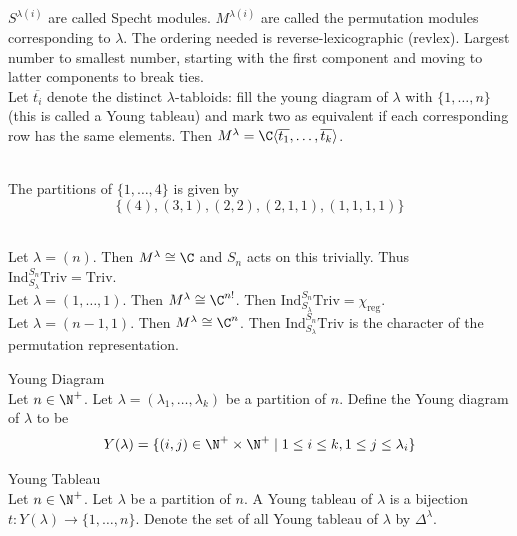 \documentclass[a4paper]{article}
\begin{document}
$S^{\lambda(i)}$ are called Specht modules. $M^{\lambda(i)}$ are called the permutation modules corresponding to $\lambda$. The ordering needed is reverse-lexicographic (revlex). Largest number to smallest number, starting with the first component and moving to latter components to break ties. \\

Let $\overline{t_i}$ denote the distinct $\lambda$-tabloids: fill the young diagram of $\lambda$ with $\{1,\dots,n\}$ (this is called a Young tableau) and mark two as equivalent if each corresponding row has the same elements. Then $M^\lambda=\C\langle\overline{t_1},\dots,\overline{t_k}\rangle$. 

\begin{eg}{}{}\\
The partitions of $\{1,\dots,4\}$ is given by $$\{(4),(3,1),(2,2),(2,1,1),(1,1,1,1)\}$$ 
\end{eg}

\begin{eg}{}{}\\
Let $\lambda=(n)$. Then $M^\lambda\cong\C$ and $S_n$ acts on this trivially. Thus $\text{Ind}_{S_\lambda}^{S_n}\text{Triv}=\text{Triv}$. \\

Let $\lambda=(1,\dots,1)$. Then $M^\lambda\cong\C^{n!}$. Then $\text{Ind}_{S_\lambda}^{S_n}\text{Triv}=\chi_\text{reg}$. \\

Let $\lambda=(n-1,1)$. Then $M^\lambda\cong\C^n$. Then $\text{Ind}_{S_\lambda}^{S_n}\text{Triv}$ is the character of the permutation representation. 
\end{eg}

\begin{defn}{Young Diagram}{}\\
Let $n\in\N^+$. Let $\lambda=(\lambda_1,\dots,\lambda_k)$ be a partition of $n$. Define the Young diagram of $\lambda$ to be $$Y(\lambda)=\{(i,j)\in\N^+\times\N^+\;|\;1\leq i\leq k,1\leq j\leq\lambda_i\}$$
\end{defn}

\begin{defn}{Young Tableau}{}\\
Let $n\in\N^+$. Let $\lambda$ be a partition of $n$. A Young tableau of $\lambda$ is a bijection $t:Y(\lambda)\to\{1,\dots,n\}$. Denote the set of all Young tableau of $\lambda$ by $\Delta^\lambda$. 
\end{defn}
\end{document}
